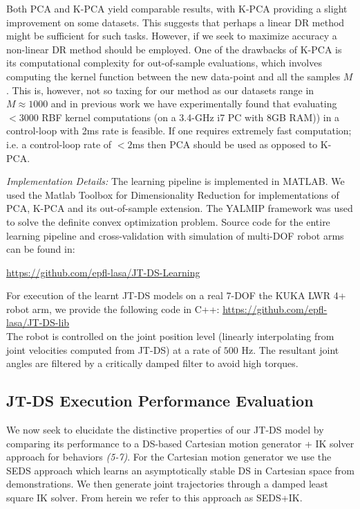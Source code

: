 \documentclass[letterpaper, 10 pt, conference,fleqn]{ieeeconf}
\begin{document}
Both PCA and K-PCA yield comparable results, with K-PCA providing a slight improvement on some datasets. This suggests that perhaps a linear DR method might be sufficient for such tasks. However, if we seek to maximize accuracy a non-linear DR method should be employed. One of the drawbacks of K-PCA is its computational complexity for out-of-sample evaluations, which involves computing the kernel function between the new data-point and all the samples $M$. This is, however, not so taxing for our method as our datasets range in $M\approx1000$ and in previous work \cite{Mirrazavi:IJRR:2017} we have experimentally found that evaluating $<3000$ RBF kernel computations (on a 3.4-GHz i7 PC with 8GB RAM)) in a control-loop with 2ms rate is feasible. If one requires extremely fast computation; i.e. a control-loop rate of $<2$ms then PCA should be used as opposed to K-PCA.


\textit{Implementation Details:} The learning pipeline is implemented in MATLAB. We used the Matlab Toolbox for Dimensionality Reduction \cite{Maaten08dimensionalityreduction} for implementations of PCA, K-PCA and its out-of-sample extension. The YALMIP framework \cite{lofberg2004yalmip} was used to solve the definite convex optimization problem. Source code for the entire learning pipeline and cross-validation with simulation of multi-DOF robot arms can be found in:
\footnotesize  \centerline{\underline{\url{https://github.com/epfl-lasa/JT-DS-Learning}}}
\normalsize

For execution of the learnt JT-DS models on a real 7-DOF the KUKA LWR 4+ robot arm, we provide the following code in C++:
\footnotesize \underline{\url{https://github.com/epfl-lasa/JT-DS-lib}}\\
\normalsize
The robot is controlled on the joint position level (linearly interpolating from joint velocities computed from JT-DS) at a rate of $ 500 $ Hz. The resultant joint angles are filtered by a critically damped filter to avoid high torques.

\subsection{JT-DS Execution Performance Evaluation}
We now seek to elucidate the distinctive properties of our JT-DS model by comparing its performance to a DS-based Cartesian motion generator + IK solver approach for behaviors \textit{(5-7)}. For the Cartesian motion generator we use the SEDS approach \cite{khansari2011learning} which learns an asymptotically stable DS in Cartesian space from demonstrations. We then generate joint trajectories through a damped least square IK solver. From herein we refer to this approach as SEDS+IK.
\end{document}
